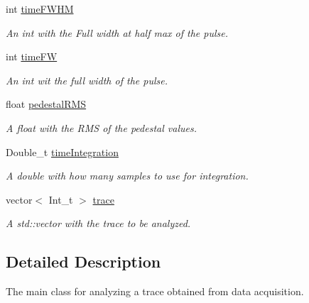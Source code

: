 \begin{DoxyCompactItemize}
\mbox{\label{classPulse_abbd514600d70e7791673c66152c91e2f}} 
int \hyperlink{classPulse_abbd514600d70e7791673c66152c91e2f}{time\+F\+W\+HM}
\begin{DoxyCompactList}\small\item\em An int with the Full width at half max of the pulse. \end{DoxyCompactList}\item 
\mbox{\label{classPulse_a89c2ae2c429c6b64ea2e5e7c7630f0b0}} 
int \hyperlink{classPulse_a89c2ae2c429c6b64ea2e5e7c7630f0b0}{time\+FW}
\begin{DoxyCompactList}\small\item\em An int wit the full width of the pulse. \end{DoxyCompactList}\item 
\mbox{\label{classPulse_a4d5a1c2ae9a55fbf9ebd8514c1554a8b}} 
float \hyperlink{classPulse_a4d5a1c2ae9a55fbf9ebd8514c1554a8b}{pedestal\+R\+MS}
\begin{DoxyCompactList}\small\item\em A float with the R\+MS of the pedestal values. \end{DoxyCompactList}\item 
\mbox{\label{classPulse_a73ce37158adfc90e8ec03efbe08641e0}} 
Double\+\_\+t \hyperlink{classPulse_a73ce37158adfc90e8ec03efbe08641e0}{time\+Integration}
\begin{DoxyCompactList}\small\item\em A double with how many samples to use for integration. \end{DoxyCompactList}\item 
\mbox{\label{classPulse_a06b5a0a179c529bb8d6447ba2dd24917}} 
vector$<$ Int\+\_\+t $>$ \hyperlink{classPulse_a06b5a0a179c529bb8d6447ba2dd24917}{trace}
\begin{DoxyCompactList}\small\item\em A std\+::vector with the trace to be analyzed. \end{DoxyCompactList}\end{DoxyCompactItemize}


\subsection{Detailed Description}
The main class for analyzing a trace obtained from data acquisition. 

